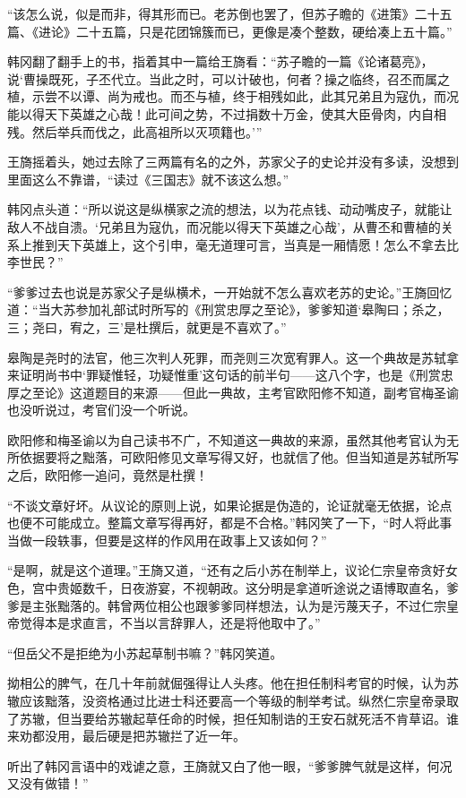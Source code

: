 “该怎么说，似是而非，得其形而已。老苏倒也罢了，但苏子瞻的《进策》二十五篇、《进论》二十五篇，只是花团锦簇而已，更像是凑个整数，硬给凑上五十篇。”

韩冈翻了翻手上的书，指着其中一篇给王旖看：“苏子瞻的一篇《论诸葛亮》，说‘曹操既死，子丕代立。当此之时，可以计破也，何者？操之临终，召丕而属之植，示尝不以谭、尚为戒也。而丕与植，终于相残如此，此其兄弟且为寇仇，而况能以得天下英雄之心哉！此可间之势，不过捐数十万金，使其大臣骨肉，内自相残。然后举兵而伐之，此高祖所以灭项籍也。’”

王旖摇着头，她过去除了三两篇有名的之外，苏家父子的史论并没有多读，没想到里面这么不靠谱，“读过《三国志》就不该这么想。”

韩冈点头道：“所以说这是纵横家之流的想法，以为花点钱、动动嘴皮子，就能让敌人不战自溃。‘兄弟且为寇仇，而况能以得天下英雄之心哉’，从曹丕和曹植的关系上推到天下英雄上，这个引申，毫无道理可言，当真是一厢情愿！怎么不拿去比李世民？”

“爹爹过去也说是苏家父子是纵横术，一开始就不怎么喜欢老苏的史论。”王旖回忆道：“当大苏参加礼部试时所写的《刑赏忠厚之至论》，爹爹知道‘皋陶曰；杀之，三；尧曰，宥之，三’是杜撰后，就更是不喜欢了。”

皋陶是尧时的法官，他三次判人死罪，而尧则三次宽宥罪人。这一个典故是苏轼拿来证明尚书中‘罪疑惟轻，功疑惟重’这句话的前半句——这八个字，也是《刑赏忠厚之至论》这道题目的来源——但此一典故，主考官欧阳修不知道，副考官梅圣谕也没听说过，考官们没一个听说。

欧阳修和梅圣谕以为自己读书不广，不知道这一典故的来源，虽然其他考官认为无所依据要将之黜落，可欧阳修见文章写得又好，也就信了他。但当知道是苏轼所写之后，欧阳修一追问，竟然是杜撰！

“不谈文章好坏。从议论的原则上说，如果论据是伪造的，论证就毫无依据，论点也便不可能成立。整篇文章写得再好，都是不合格。”韩冈笑了一下，“时人将此事当做一段轶事，但要是这样的作风用在政事上又该如何？”

“是啊，就是这个道理。”王旖又道，“还有之后小苏在制举上，议论仁宗皇帝贪好女色，宫中贵姬数千，日夜游宴，不视朝政。这分明是拿道听途说之语博取直名，爹爹是主张黜落的。韩曾两位相公也跟爹爹同样想法，认为是污蔑天子，不过仁宗皇帝觉得本是求直言，不当以言辞罪人，还是将他取中了。”

“但岳父不是拒绝为小苏起草制书嘛？”韩冈笑道。

拗相公的脾气，在几十年前就倔强得让人头疼。他在担任制科考官的时候，认为苏辙应该黜落，没资格通过比进士科还要高一个等级的制举考试。纵然仁宗皇帝录取了苏辙，但当要给苏辙起草任命的时候，担任知制诰的王安石就死活不肯草诏。谁来劝都没用，最后硬是把苏辙拦了近一年。

听出了韩冈言语中的戏谑之意，王旖就又白了他一眼，“爹爹脾气就是这样，何况又没有做错！”

